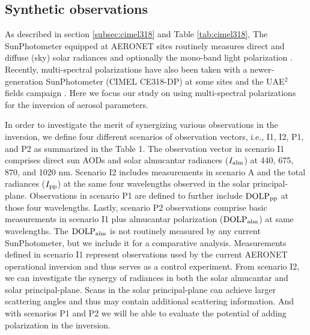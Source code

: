 \subsection{Synthetic observations}

As described in section \ref{subsec:cimel318} and Table \ref{tab:cimel318}, 
The SunPhotometer equipped at AERONET sites routinely measures direct and
diffuse (sky) solar radiances and optionally the mono-band light 
polarization \citep{Holben98}. Recently, multi-spectral polarizations 
have also been taken with a newer-generation SunPhotometer (CIMEL CE318-DP) 
at some sites \citep{Li09} and the UAE$^2$ fields campaign \citet{Reid08}.
 Here we focus our study on using multi-spectral polarizations 
for the inversion of aerosol parameters. 

In order to investigate the merit of synergizing various observations in the
inversion, we define four different scenarios of observation vectors, i.e., I1,
I2, P1, and P2 as summarized in the Table 1. The observation vector in scenario
I1 comprises direct sun AODs and solar almucantar radiances ($I_\text{alm}$) at 440,
675, 870, and 1020 nm. Scenario I2 includes measurements in scenario A and the
total radiances ($I_\text{pp}$) at the same four wavelengths observed in the solar
principal-plane. Observations in scenario P1 are defined to further include
$\text{DOLP}_\text{pp}$ at those four wavelengths. Lastly, scenario P2 observations comprise
basic measurements in scenario I1 plus almucantar polarization ($\text{DOLP}_\text{alm}$) at
same wavelengths. The $\text{DOLP}_\text{alm}$ is not routinely measured by any current
SunPhotometer, but we include it for a comparative analysis. Measurements
defined in scenario I1 represent observations used by the current AERONET
operational inversion and thus serves as a control experiment. From scenario
I2, we can investigate the synergy of radiances in both the solar almucantar
and solar principal-plane. Scans in the solar principal-plane can achieve
larger scattering angles and thus may contain additional scattering
information. And with scenarios P1 and P2 we will be able to evaluate the
potential of adding polarization in the inversion. 

